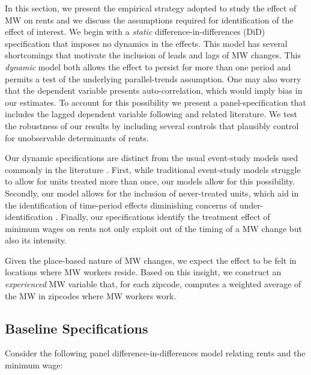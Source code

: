 
In this section, we present the empirical strategy adopted to study the effect of MW 
on rents and we discuss the assumptions required for identification of the effect of 
interest. We begin with a \textit{static} difference-in-differences (DiD) specification 
that imposes no dynamics in the effects. This model has several shortcomings that 
motivate the inclusion of leads and lags of MW changes. This \textit{dynamic} model 
both allows the effect to persist for more than one period and permits a test of the 
underlying parallel-trends assumption. One may also worry that the dependent variable 
presents auto-correlation, which would imply bias in our estimates. To account for 
this possibility we present a panel-specification that includes the lagged dependent 
variable following \textcite{ArellanoBond1991} and related literature. We test the 
robustness of our results by including several controls that plausibly control for 
unobservable determinants of rents.

Our dynamic specifications are distinct from the usual event-study models used 
commonly in the literature \parencite[discussed in, e.g.,][]{BorusyakJaravel2017, 
abraham2018}. First, while traditional event-study models struggle to allow for 
units treated more than once, our models allow for this possibility. Secondly, 
our model allows for the inclusion of never-treated units, which aid in the 
identification of time-period effects diminishing concerns of under-identification 
\parencite{BorusyakJaravel2017}. Finally, our specifications identify the treatment 
effect of minimum wages on rents not only exploit out of the timing of a MW change 
but also its intensity.
    
Given the place-based nature of MW changes, we expect the effect to be felt in locations where MW workers reside. Based on this insight, we construct an \textit{experienced} MW variable that, for each zipcode, computes a weighted average of the MW in zipcodes where MW workers work. %

\subsection{Baseline Specifications}
Consider the following panel difference-in-differences model relating rents and the minimum wage:


